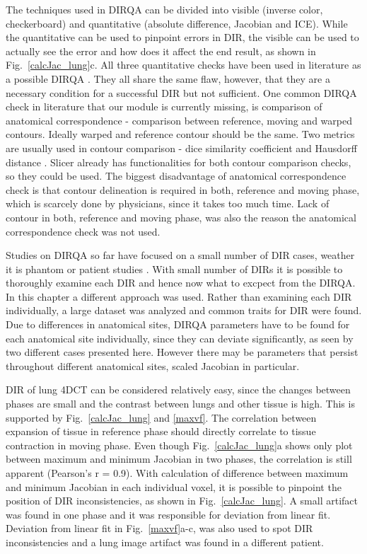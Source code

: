 \documentclass[type=dr, dr=rernat, accentcolor=tud7b,colorbacktitle, bigchapter, openright, twoside, 12pt ]{tudthesis}
\begin{document}
The techniques used in DIRQA can be divided into visible (inverse color, checkerboard) and quantitative (absolute difference, Jacobian and ICE). While the quantitative can be used to pinpoint errors in DIR, the visible can be used to actually see the error and how does it affect the
end result, as shown in Fig.~\ref{calcJac_lung}c. All three quantitative checks have been used in literature as a possible DIRQA \cite{Varadhan2013, Leow2007, Christensen2001, Bender2009}. They all share the same flaw, however, that they are a necessary condition for a successful
DIR but not sufficient. One common DIRQA check in literature that our module is currently missing, is comparison of anatomical correspondence - 
comparison between reference, moving and warped contours. Ideally warped and reference contour should be the same. Two metrics are usually used in contour comparison -
dice similarity coefficient \cite{Varadhan2013} and Hausdorff distance \cite{Huttenlocher1993}. Slicer already has functionalities for both contour comparison checks, so they could be used. 
The biggest disadvantage of anatomical correspondence check is that contour delineation is required in both, reference and moving phase, which is scarcely done by physicians, 
since it takes too much time. Lack of contour in both, reference and moving phase, was also the reason the anatomical correspondence check was not used.

Studies on DIRQA so far have focused on a small number of DIR cases, weather it is phantom \cite{Mutic2001,Moore2004} or patient studies \cite{Wu2008, Varadhan2013}. With small number of DIRs
it is possible to thoroughly examine each DIR and hence now what to excpect from the DIRQA. In this chapter a different approach was
used. Rather than examining each DIR individually, a large dataset was analyzed and common traits for DIR were found. Due to differences in anatomical sites, 
DIRQA parameters have to be found for each anatomical site individually, since they can
deviate significantly, as seen by two different cases presented here. However there may be parameters that persist throughout different anatomical sites, scaled Jacobian in particular.

DIR of lung 4DCT can be considered relatively easy, since the changes between phases are small and the contrast between lungs and other tissue is high. 
This is supported by Fig.~\ref{calcJac_lung} and \ref{maxvf}. The correlation between expansion of tissue in reference phase should directly correlate to tissue contraction in moving phase. 
Even though Fig.~\ref{calcJac_lung}a shows only plot between maximum and minimum Jacobian in two phases, the correlation is still apparent (Pearson's r = 0.9). With calculation
of difference between maximum and minimum Jacobian in each individual voxel, it is possible to pinpoint the position of DIR inconsistencies, as shown in Fig.~\ref{calcJac_lung}. A small
artifact was found in one phase and it was responsible for deviation from linear fit. Deviation from linear fit in Fig.~\ref{maxvf}a-c, was also used to spot DIR inconsistencies
and a lung image artifact was found in a different patient.
\end{document}
